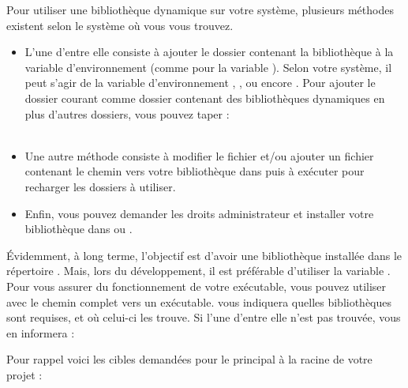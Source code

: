 \bigskip

\noindent Pour utiliser une bibliothèque dynamique sur votre système, plusieurs méthodes existent selon le système où vous vous trouvez.\\

\begin{itemize}
\item L'une d'entre elle consiste à ajouter le dossier contenant la bibliothèque à la variable d'environnement  (comme pour la variable ).
Selon votre système, il peut s'agir de la variable d'environnement , , ou encore .
Pour ajouter le dossier courant comme dossier contenant des bibliothèques dynamiques en plus d'autres dossiers, vous pouvez taper :\\
\\

\item Une autre méthode consiste à modifier le fichier  et/ou ajouter un fichier contenant le chemin vers votre bibliothèque dans  puis à exécuter  pour recharger les dossiers à utiliser.\\

\item Enfin, vous pouvez demander les droits administrateur et installer votre bibliothèque dans  ou .\\
\end{itemize}

\bigskip

\noindent \'Evidemment, à long terme, l'objectif est d'avoir une bibliothèque installée dans le répertoire .
Mais, lors du développement, il est préférable d'utiliser la variable .
Pour vous assurer du fonctionnement de votre exécutable, vous pouvez utiliser  avec le chemin complet vers un exécutable.
 vous indiquera quelles bibliothèques sont requises, et où celui-ci les trouve.
Si l'une d'entre elle n'est pas trouvée,  vous en informera :\\




\bigskip

\noindent Pour rappel voici les cibles demandées pour le  principal à la racine de votre projet :

